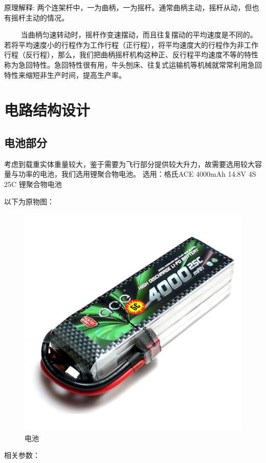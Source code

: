 \documentclass{ctexart}
\begin{document}
原理解释: 两个连架杆中，一为曲柄，一为摇杆。通常曲柄主动，摇杆从动，但也有摇杆主动的情况。\par　　
当曲柄匀速转动时，摇杆作变速摆动，而且往复摆动的平均速度是不同的。若将平均速度小的行程作为工作行程（正行程），将平均速度大的行程作为非工作行程（反行程），那么，我们把曲柄摇杆机构这种正、反行程平均速度不等的特性称为急回特性。急回特性很有用，牛头刨床、往复式运输机等机械就常常利用急回特性来缩短非生产时间，提高生产率。
\section{电路结构设计}
\subsection{电池部分}
考虑到载重实体重量较大，鉴于需要为飞行部分提供较大升力，故需要选用较大容量与功率的电池，我们选用锂聚合物电池。
选用：格氏ACE 4000mAh 14.8V 4S 25C 锂聚合物电池\par
以下为原物图：\par
\begin{figure}[H]
\centering
    \includegraphics[width = \textwidth]{021}
    \caption{电池}\par
\end{figure}
相关参数：\par
\end{document}
